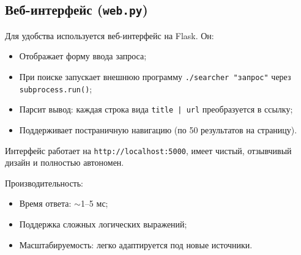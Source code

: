 \subsection*{Веб-интерфейс (\texttt{web.py})}
Для удобства используется веб-интерфейс на Flask. Он:
\begin{itemize}
\item Отображает форму ввода запроса;
\item При поиске запускает внешнюю программу \texttt{./searcher "запрос"} через \texttt{subprocess.run()};
\item Парсит вывод: каждая строка вида \texttt{title | url} преобразуется в ссылку;
\item Поддерживает постраничную навигацию (по 50 результатов на страницу).
\end{itemize}
Интерфейс работает на \texttt{http://localhost:5000}, имеет чистый, отзывчивый дизайн и полностью автономен.

Производительность:
\begin{itemize}
\item Время ответа: $\sim$1–5 мс;
\item Поддержка сложных логических выражений;
\item Масштабируемость: легко адаптируется под новые источники.
\end{itemize}

\pagebreak

